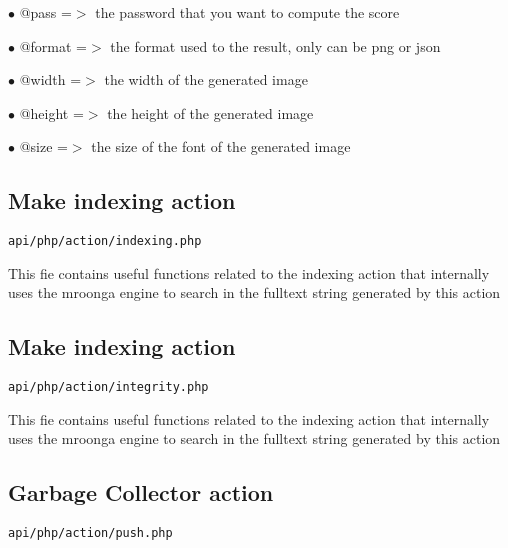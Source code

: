 \documentclass[a4paper]{article}
\begin{document}
\begin{compactitem}
\item[\color{myblue}$\bullet$] @pass   =$>$ the password that you want to compute the score
\item[\color{myblue}$\bullet$] @format =$>$ the format used to the result, only can be png or json
\end{compactitem}

\begin{compactitem}
\item[\color{myblue}$\bullet$] @width  =$>$ the width of the generated image
\item[\color{myblue}$\bullet$] @height =$>$ the height of the generated image
\item[\color{myblue}$\bullet$] @size   =$>$ the size of the font of the generated image
\end{compactitem}

\hypertarget{toc8}{}
\subsection{Make indexing action}

\begin{lstlisting}
api/php/action/indexing.php
\end{lstlisting}

This fie contains useful functions related to the indexing action that internally uses the
mroonga engine to search in the fulltext string generated by this action

\hypertarget{toc9}{}
\subsection{Make indexing action}

\begin{lstlisting}
api/php/action/integrity.php
\end{lstlisting}

This fie contains useful functions related to the indexing action that internally uses the
mroonga engine to search in the fulltext string generated by this action

\hypertarget{toc10}{}
\subsection{Garbage Collector action}

\begin{lstlisting}
api/php/action/push.php
\end{lstlisting}
\end{document}
